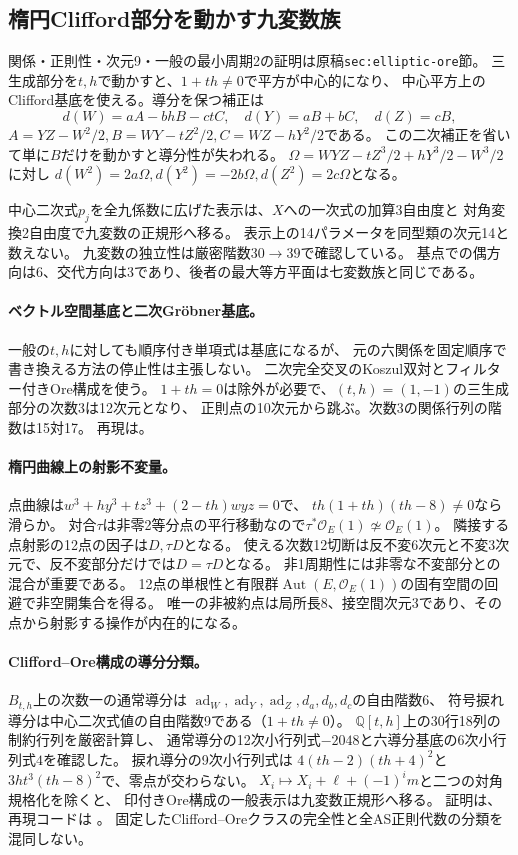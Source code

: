 \documentclass[11pt,a4paper]{ltjsarticle}
\begin{document}
\subsection*{楕円Clifford部分を動かす九変数族}
関係・正則性・次元9・一般の最小周期2の証明は原稿\texttt{sec:elliptic-ore}節。
三生成部分を$t,h$で動かすと、$1+th\ne0$で平方が中心的になり、
中心平方上のClifford基底を使える。導分を保つ補正は
\[
 d(W)=aA-bhB-ctC,\quad d(Y)=aB+bC,\quad d(Z)=cB,
\]
$A=YZ-W^2/2,B=WY-tZ^2/2,C=WZ-hY^2/2$である。
この二次補正を省いて単に$B$だけを動かすと導分性が失われる。
$\Omega=WYZ-tZ^3/2+hY^3/2-W^3/2$に対し
$d(W^2)=2a\Omega,d(Y^2)=-2b\Omega,d(Z^2)=2c\Omega$となる。

中心二次式$p_j$を全九係数に広げた表示は、$X$への一次式の加算3自由度と
対角変換2自由度で九変数の正規形へ移る。
表示上の14パラメータを同型類の次元14と数えない。
九変数の独立性は厳密階数$30\to39$で確認している。
基点での偶方向は6、交代方向は3であり、後者の最大等方平面は七変数族と同じである。

\paragraph{ベクトル空間基底と二次Gr\"obner基底。}
一般の$t,h$に対しても順序付き単項式は基底になるが、
元の六関係を固定順序で書き換える方法の停止性は主張しない。
二次完全交叉のKoszul双対とフィルター付きOre構成を使う。
$1+th=0$は除外が必要で、$(t,h)=(1,-1)$の三生成部分の次数3は12次元となり、
正則点の10次元から跳ぶ。次数3の関係行列の階数は15対17。
再現は。

\paragraph{楕円曲線上の射影不変量。}
点曲線は$w^3+hy^3+tz^3+(2-th)wyz=0$で、
$th(1+th)(th-8)\ne0$なら滑らか。
対合$\tau$は非零2等分点の平行移動なので$\tau^*\mathcal O_E(1)\not\simeq\mathcal O_E(1)$。
隣接する点射影の12点の因子は$D,\tau D$となる。
使える次数12切断は反不変6次元と不変3次元で、反不変部分だけでは$D=\tau D$となる。
非1周期性には非零な不変部分との混合が重要である。
12点の単根性と有限群$\operatorname{Aut}(E,\mathcal O_E(1))$の固有空間の回避で非空開集合を得る。
唯一の非被約点は局所長8、接空間次元3であり、その点から射影する操作が内在的になる。

\paragraph{Clifford–Ore構成の導分分類。}
$B_{t,h}$上の次数一の通常導分は
$\operatorname{ad}_W,\operatorname{ad}_Y,\operatorname{ad}_Z,d_a,d_b,d_c$の自由階数6、
符号捩れ導分は中心二次式値の自由階数9である（$1+th\ne0$）。
$\mathbb Q[t,h]$上の30行18列の制約行列を厳密計算し、
通常導分の12次小行列式$-2048$と六導分基底の6次小行列式$4$を確認した。
捩れ導分の9次小行列式は
$4(th-2)(th+4)^2$と$3ht^3(th-8)^2$で、零点が交わらない。
$X_i\mapsto X_i+\ell+(-1)^im$と二つの対角規格化を除くと、
印付きOre構成の一般表示は九変数正規形へ移る。
証明は、再現コードは
。
固定したClifford–Oreクラスの完全性と全AS正則代数の分類を混同しない。
\end{document}
